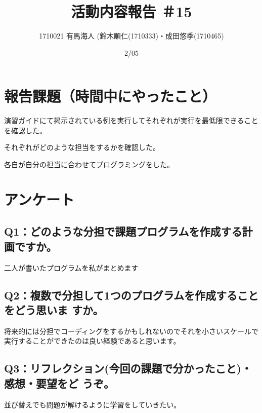 \documentclass[12pt,a4j]{jarticle}
\begin{document}
\title{活動内容報告 ＃15}
\author{1710021 有馬海人 (鈴木順仁(1710333)・成田悠季(1710465)}
\date{2/05}
\maketitle

\section{報告課題（時間中にやったこと）}
演習ガイドにて掲示されている例を実行してそれぞれが実行を最低限できることを確認した。

それぞれがどのような担当をするかを確認した。

各自が自分の担当に合わせてプログラミングをした。
\section{アンケート}

\subsection{Q1：どのような分担で課題プログラムを作成する計画ですか。}
二人が書いたプログラムを私がまとめます
\subsection{Q2：複数で分担して1つのプログラムを作成することをどう思いま
すか。}
将来的には分担でコーディングをするかもしれないのでそれを小さいスケールで実行することができたのは良い経験であると思います。

\subsection{Q3：リフレクション(今回の課題で分かったこと)・感想・要望をど
うぞ。}
並び替えでも問題が解けるように学習をしていきたい。
\end{document}
